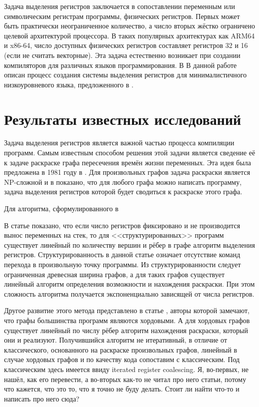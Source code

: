\documentclass[a4paper,14pt]{extarticle}
\begin{document}
Задача выделения регистров заключается в сопоставлении переменным или символическим регистрам программы, физических регистров.
Первых может быть практически неограниченное количество, а число вторых жёстко ограничено целевой архитектурой процессора.
В таких популярных архитектурах как ARM64 и x86-64, число доступных физических регистров составляет регистров 32 и 16 (если не считать векторные).
Эта задача естественно возникает при создании компиляторов для различных языков программирования.
В 
В данной работе описан процесс создания системы выделения регистров для минималистичного низкоуровневого языка, предложенного в \cite{____2023}.

\section{Результаты известных исследований}

Задача выделения регистров является важной частью процесса компиляции программ.
Самым известным способом решения этой задачи является сведение её к задаче раскраске графа пересечения времён жизни переменных.
Эта идея была предложена в 1981 году в \cite{chaitin_register_1981}.
Для произвольных графов задача раскраски является NP-сложной и в \cite{chaitin_register_1981} показано,
что для любого графа можно написать программу, задача выделения регистров которой будет сводиться к раскраске этого графа.

Для алгоритма, сформулированного в \cite{chaitin_register_1981}

В статье \cite{hans_l_bodlaender_linear-time_1997} показано, что если число регистров фиксировано и не производится вынос переменных на стек,
то для <<структурированных>> программ существует линейный по количеству вершин и рёбер в графе алгоритм выделения регистров.
Структурированность в данной статье означает отсутствие команд перехода в произвольную точку программы.
Из структурированности следует ограниченная древесная ширина графов, а для таких графов существует линейный алгоритм определения возможности и нахождения раскраски.
При этом сложность алгоритма получается экспоненциально зависящей от числа регистров.

Другое развитие этого метода представлено в статье \cite{hutchison_register_2005}, 
авторы которой замечают, что графы большинства программ являются хордовыми.
А для хордовых графов существует линейный по числу рёбер алгоритм нахождения раскраски, который они и реализуют. 
Получившийся алгоритм не итеративный, в отличие от классического, основанного на раскраске произвольных графов,
линейный в случае хордовых графов и по качеству кода сопоставим с классическим.
{\color{red}
    Под классическим здесь имеется ввиду iterated register coalescing. Я, во-первых, не нашёл, как его перевести,
    а во-вторых как-то не читал про него статьи, потому что кажется, что это то, что я точно не буду делать.
    Стоит ли найти что-то и написать про него сюда?
}
\end{document}
